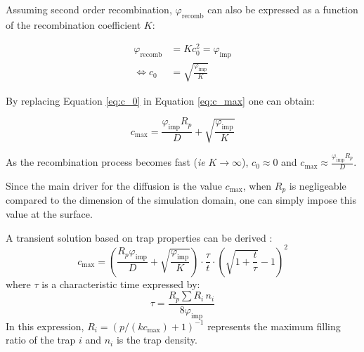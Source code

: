 Assuming second order recombination, $\varphi_\mathrm{recomb}$ can also be expressed as a function of the recombination coefficient $K$:

\begin{eqnarray}
    \varphi_\mathrm{recomb} &= K c_{0}^{2} = \varphi_\mathrm{imp}\\
    \Leftrightarrow c_{0} &= \sqrt{\frac{\varphi_\mathrm{imp}}{K}}
    \label{eq:c_0}
\end{eqnarray}

By replacing Equation \ref{eq:c_0} in Equation \ref{eq:c_max} one can obtain:

\begin{equation}
    c_\mathrm{max} = \frac{\varphi_\mathrm{imp} R_{p}}{D}+\sqrt{\frac{\varphi_\mathrm{imp}}{K}}
\end{equation}

As the recombination process becomes fast (\textit{ie} $K \rightarrow \infty$), $c_0 \approx 0$ and $c_\mathrm{max} \approx \frac{\varphi_\mathrm{imp} R_{p}}{D}$.

Since the main driver for the diffusion is the value $c_\mathrm{max}$, when $R_p$ is negligeable compared to the dimension of the simulation domain, one can simply impose this value at the surface.

A transient solution based on trap properties can be derived :
\begin{equation}
    c_\mathrm{max}=(\frac{R_p \varphi_\mathrm{imp}}{D} + \sqrt{\frac{\varphi_\mathrm{imp}}{K}}) \cdot \frac{\tau}{t} \cdot\left(\sqrt{1+\frac{t}{\tau}}-1\right)^2
\end{equation}
where $\tau$ is a characteristic time expressed by:
\begin{equation}
    \tau = \frac{R_p \sum R_i \, n_i}{8 \varphi_\mathrm{imp}}
\end{equation}
In this expression, $R_i = (p / (k c_\mathrm{max}) + 1)^{-1}$ represents the maximum filling ratio of the trap $i$ and $n_i$ is the trap density.


